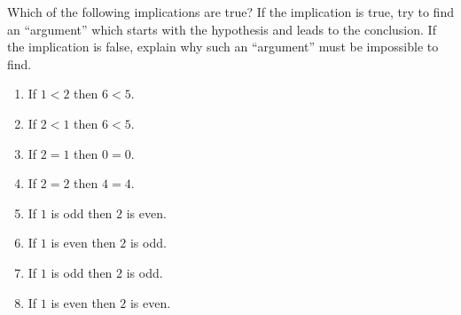 \begin{xca}
	Which of the following implications are true?  If the implication is true, try to find an ``argument'' which starts with the hypothesis and leads to the conclusion.  If the implication is false, explain why such an ``argument'' must be impossible to find.
		\begin{enumerate}
			\item If $1<2$ then $6<5$.
			\item If $2<1$ then $6<5$.
			\item If $2 = 1$ then $0 = 0$.
			\item If $2 = 2$ then $4 = 4$.
			\item If $1$ is odd then $2$ is even.
			\item If $1$ is even then $2$ is odd.
			\item If $1$ is odd then $2$ is odd.
			\item If $1$ is even then $2$ is even. 
		\end{enumerate}
\end{xca}

